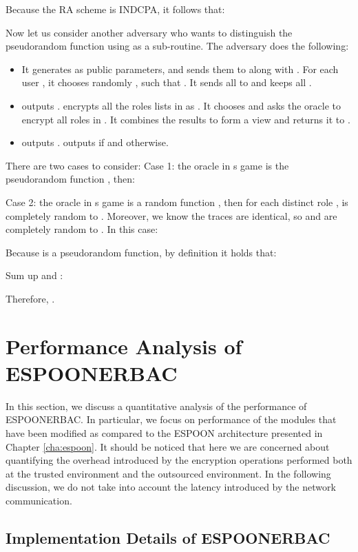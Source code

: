 \documentclass[epsfig,a4paper,11pt,titlepage]{book}
\numberwithin{algorithm}{chapter}
\begin{document}
Because the \gls{RA} scheme is \gls{INDCPA}, it follows that:



Now let us consider another adversary  who wants to distinguish the pseudorandom function  using  as a sub-routine. The adversary does the following:
\begin{itemize}
\item It generates  as public parameters, and sends them to  along with . For each user , it chooses randomly ,  such that . It sends all  to  and keeps all .
\item  outputs .  encrypts all the roles lists in  as . It chooses  and asks the oracle to encrypt all roles in . It combines the results to form a view  and returns it to .
\item  outputs .  outputs  if  and  otherwise.
\end{itemize}

There are two cases to consider:
Case 1: the oracle in s game is the pseudorandom function , then:



Case 2: the oracle in s game is a random function , then for each distinct
role ,  is completely random to . Moreover, we know the traces are identical, so  and  are completely random to . In this case:


Because  is a pseudorandom function, by definition it holds that:


Sum up  and :



Therefore, .

\section[Performance Analysis of ESPOON]{Performance Analysis of \gls{ESPOONERBAC}}
\label{sec:erbac-performance-analysis}
In this section, we discuss a quantitative analysis of the performance of \gls{ESPOONERBAC}. In particular, we focus on performance of the modules that have been modified as compared to the \gls{ESPOON} architecture presented in Chapter \ref{cha:espoon}. It should be noticed that here we are concerned about quantifying the overhead introduced by the encryption operations performed both at the trusted environment and the outsourced environment. In the following discussion, we do not take into account the latency introduced by the network communication.

\subsection[Implementation Details of ESPOON]{Implementation Details of \gls{ESPOONERBAC}}
\end{document}

